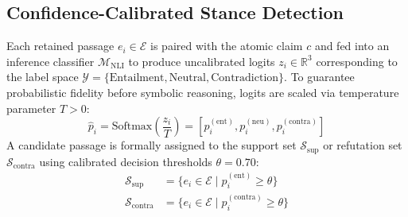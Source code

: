 \documentclass[11pt,a4paper]{article}
\begin{document}
\subsection{Confidence-Calibrated Stance Detection}
Each retained passage $e_i \in \mathcal{E}$ is paired with the atomic claim $c$ and fed into an inference classifier $\mathcal{M}_{\text{NLI}}$ to produce uncalibrated logits $z_i \in \mathbb{R}^3$ corresponding to the label space $\mathcal{Y} = \{\text{Entailment}, \text{Neutral}, \text{Contradiction}\}$.
To guarantee probabilistic fidelity before symbolic reasoning, logits are scaled via temperature parameter $T > 0$:
\begin{equation}
\hat{p}_i = \text{Softmax}\left(\frac{z_i}{T}\right) = [p_i^{(\text{ent})}, p_i^{(\text{neu})}, p_i^{(\text{contra})}]
\end{equation}
A candidate passage is formally assigned to the support set $\mathcal{S}_{\text{sup}}$ or refutation set $\mathcal{S}_{\text{contra}}$ using calibrated decision thresholds $\theta = 0.70$:
\begin{align}
\mathcal{S}_{\text{sup}} &= \{e_i \in \mathcal{E} \mid p_i^{(\text{ent})} \ge \theta\} \\
\mathcal{S}_{\text{contra}} &= \{e_i \in \mathcal{E} \mid p_i^{(\text{contra})} \ge \theta\}
\end{align}
\end{document}
